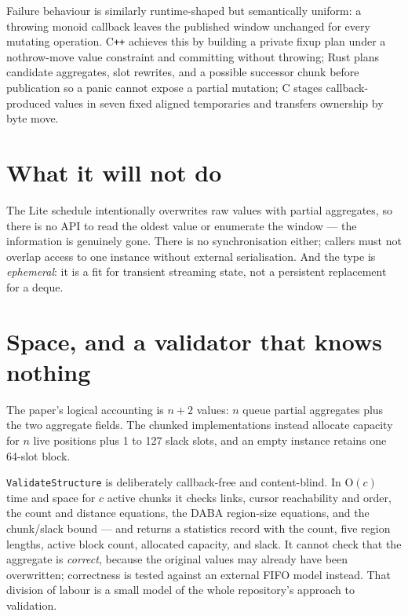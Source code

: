 \documentclass[11pt,twoside,openright]{book}
\newcommand{\code}[1]{\texorpdfstring{\textcolor{d7ink}{\texttt{#1}}}{#1}}
\newcommand{\bigoh}[1]{$\mathrm{O}(#1)$}
\begin{document}
Failure behaviour is similarly runtime-shaped but semantically uniform: a
throwing monoid callback leaves the published window unchanged for every
mutating operation. C\texttt{++} achieves this by building a private fixup plan
under a nothrow-move value constraint and committing without throwing; Rust
plans candidate aggregates, slot rewrites, and a possible successor chunk before
publication so a panic cannot expose a partial mutation; C stages
callback-produced values in seven fixed aligned temporaries and transfers
ownership by byte move.

\section{What it will not do}

\begin{caveatbox}
The Lite schedule intentionally overwrites raw values with partial aggregates,
so there is no API to read the oldest value or enumerate the window --- the
information is genuinely gone. There is no synchronisation either; callers must
not overlap access to one instance without external serialisation. And the type
is \emph{ephemeral}: it is a fit for transient streaming state, not a persistent
replacement for a deque.
\end{caveatbox}

\section{Space, and a validator that knows nothing}

The paper's logical accounting is $n + 2$ values: $n$ queue partial aggregates
plus the two aggregate fields. The chunked implementations instead allocate
capacity for $n$ live positions plus 1 to 127 slack slots, and an empty instance
retains one 64-slot block.

\code{ValidateStructure} is deliberately callback-free and content-blind. In
\bigoh{c} time and space for $c$ active chunks it checks links, cursor
reachability and order, the count and distance equations, the DABA region-size
equations, and the chunk/slack bound --- and returns a statistics record with the
count, five region lengths, active block count, allocated capacity, and slack.
It cannot check that the aggregate is \emph{correct}, because the original values
may already have been overwritten; correctness is tested against an external FIFO
model instead. That division of labour is a small model of the whole repository's
approach to validation.
\end{document}
